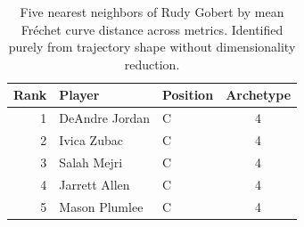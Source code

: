 \begin{table}[htbp]
  \centering\small
  \begin{tabular}{rllc}
    \toprule
    Rank & Player & Position & Archetype \\
    \midrule
    1 & DeAndre Jordan & C & 4 \\
    2 & Ivica Zubac & C & 4 \\
    3 & Salah Mejri & C & 4 \\
    4 & Jarrett Allen & C & 4 \\
    5 & Mason Plumlee & C & 4 \\
    \bottomrule
  \end{tabular}
  \caption{Five nearest neighbors of Rudy Gobert by mean Fr\'{e}chet curve distance across metrics. Identified purely from trajectory shape without dimensionality reduction.}
  \label{tab:Rudy_Gobert_frechet_curve_neighbors}
\end{table}

